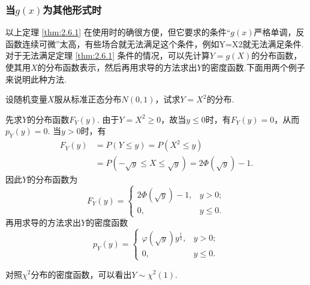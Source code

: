 \subsubsection{当$g(x)$为其他形式时}
以上定理 \ref{thm:2.6.1} 在使用时的确很方便，但它要求的条件“$g(x)$严格单调，反函数连续可微”太高，有些场合就无法满足这个条件，例如Y=X2就无法满足条件.对于无法满足定理 \ref{thm:2.6.1} 条件的情况，可以先计算$Y=g(X)$的分布函数，使其用$X$的分布函数表示，然后再用求导的方法求出$Y$的密度函数.下面用两个例子来说明此种方法.

\begin{example}
  设随机变量$X$服从标准正态分布$N(0,1)$，试求$Y=X^2$的分布.
\end{example}
\begin{solution}
  先求$Y$的分布函数$F_Y(y)$. 由于$Y=X^2\ge0$，故当$y\le0$时，有$F_Y(y)=0$，从而$p_Y(y)=0$. 当$y>0$时，有
  \begin{align*}
    F_Y(y) & = P (Y \le y) = P(X^2 \le y) \\
    & = P\left( -\sqrt y\le X\le \sqrt y \right)
    = 2\varPhi\left(\sqrt y\right) - 1.
  \end{align*}
  因此$Y$的分布函数为
  \[
    F_Y(y) = \begin{cases}
      2\varPhi\left(\sqrt y\right) - 1, & y>0; \\
      0, & y\le0.
    \end{cases}
  \]
  再用求导的方法求出$Y$的密度函数
  \[
    p_Y(y) = \begin{cases}
      \varphi\left(\sqrt y\right)y^{\frac12}, & y>0; \\
      0, & y\le0.
    \end{cases}
  \]

  对照$\chi^2$分布的密度函数，可以看出$Y\sim\chi^2(1)$.
\end{solution}

